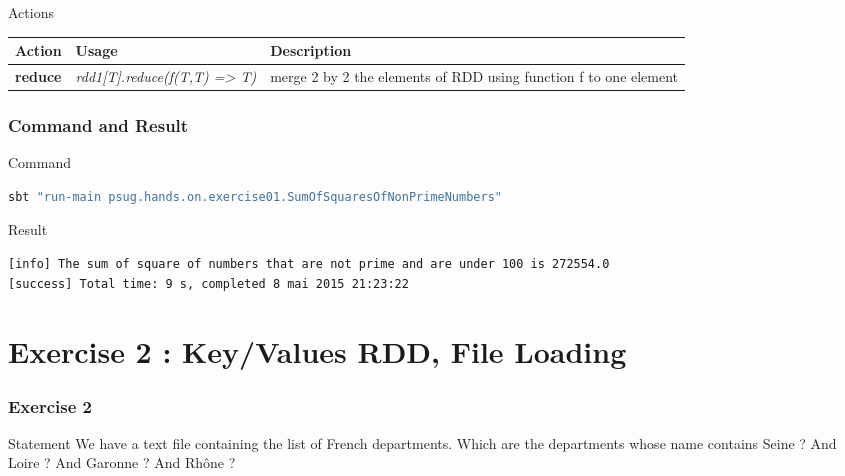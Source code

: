 \documentclass[slidetop,9pt,utf8]{beamer}
\begin{document}
\begin{CJK}{UTF8}{gbsn}
\begin{frame}
  \begin{block}{Actions}
    \begin{center}
      \begin{tabular}{|m{2.1cm}|m{3.5cm}|m{5cm}|}
        \hline 
        \rowcolor{gray} \textbf{Action} & \textbf{Usage} & \textbf{Description} \\ \hline
        \textbf{reduce} & \textit{rdd1[T].reduce(f(T,T) =\textgreater\xspace T)} & merge 2 by 2 the elements of RDD using function f to one element \\ \hline
      \end{tabular}
    \end{center}
  \end{block}

\end{frame}

\begin{frame}[fragile]
  \frametitle{Command and Result}

  \begin{block}{Command}
    \begin{lstlisting}[language=bash, style=terminal]
sbt "run-main psug.hands.on.exercise01.SumOfSquaresOfNonPrimeNumbers"
    \end{lstlisting}
  \end{block}

  \begin{block}{Result}
    \begin{lstlisting}[language=bash, style=terminal]
[info] The sum of square of numbers that are not prime and are under 100 is 272554.0
[success] Total time: 9 s, completed 8 mai 2015 21:23:22
    \end{lstlisting}
  \end{block}

\end{frame}

\section{Exercise 2 : Key/Values RDD, File Loading}

\begin{frame}
  \frametitle{Exercise 2}

  \begin{block}{Statement}
    We have a text file containing the list of French departments. Which are the departments whose name contains Seine ? And Loire ? And Garonne ? And Rhône ?
  \end{block}


\end{frame}
\end{CJK}
\end{document}
